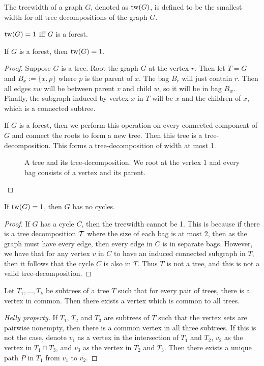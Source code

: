 \begin{definition}\label{def:treewidth}
	The treewidth of a graph $G$, denoted as $\text{tw}(G)$, is defined to be the smallest width for all tree decompositions of the graph $G$.
\end{definition}


\begin{example}\label{ex:treewidth_forest}
	$\text{tw}(G) = 1$ iff $G$ is a forest.
	\begin{lemma}
		If $G$ is a forest, then $\text{tw}(G) = 1$.
	\end{lemma}
	\begin{proof}
		Suppose $G$ is a tree. Root the graph $G$ at the vertex $r$. Then let $T = G$ and $B_x:= \lbrace x, p \rbrace$ where $p$ is the parent of $x$. The bag $B_r$ will just contain $r$. Then all edges $vw$ will be between parent $v$ and child $w$, so it will be in bag $B_w$. Finally, the subgraph induced by vertex $x$ in $T$ will be $x$ and the children of $x$, which is a connected subtree.
		
		If $G$ is a forest, then we perform this operation on every connected component of $G$ and connect the roots to form a new tree. Then this tree is a tree-decomposition. This forms a tree-decomposition of width at most 1. 
		\begin{figure}[h]
			\centering
			
			
			\caption{A tree and its tree-decomposition. We root at the vertex $1$ and every bag consists of a vertex and its parent.}
			\label{fig:tree-treedecomp}
		\end{figure}
	\end{proof}
	\begin{lemma}
		If $\text{tw}(G) = 1$, then $G$ has no cycles.
	\end{lemma}
	\begin{proof}
		If $G$ has a cycle $C$, then the treewidth cannot be 1. This is because if there is a tree decomposition $\mathcal{T}$ where the size of each bag is at most 2, then as the graph must have every edge, then every edge in $C$ is in separate bags. However, we have that for any vertex $v$ in $C$ to have an induced connected subgraph in $T$, then it follows that the cycle $C$ is also in $T$. Thus $T$ is not a tree, and this is not a valid tree-decomposition. 
	\end{proof}
\end{example}

\begin{lemma}\label{lem:Helly}
	Let $T_1, ..., T_k$ be subtrees of a tree $T$ such that for every pair of trees, there is a vertex in common. Then there exists a vertex which is common to all trees.
\end{lemma}
\begin{proof}[Helly property]
	If $T_1$, $T_2$ and $T_3$ are subtrees of $T$ such that the vertex sets are pairwise nonempty, then there is a common vertex in all three subtrees. If this is not the case, denote $v_1$ as a vertex in the intersection of $T_1$ and $T_2$, $v_2$ as the vertex in $T_1 \cap T_3$, and $v_3$ as the vertex in $T_2$ and $T_3$. Then there exists a unique path $P$ in $T_1$ from $v_1$ to $v_2$.
\end{proof}

